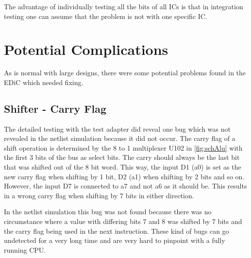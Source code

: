 The advantage of individually testing all the bits of all \glspl{IC} is that in integration testing one can assume that the problem is not with one specific \gls{IC}.
\section{Potential Complications}\label{sec:switchGlitch}
As is normal with large designs, there were some potential problems found in the \gls{EDiC} which needed fixing.
\subsection{Shifter - Carry Flag}
The detailed testing with the test adapter did reveal one bug which was not revealed in the netlist simulation because it did not occur.
The carry flag of a shift operation is determined by the 8 to 1 multiplexer U102 in \cref{fig:schAlu} with the first 3 bits of the bus as select bits.
The carry should always be the last bit that was shifted out of the 8 bit word.
This way, the input D1 (a0) is set as the new carry flag when shifting by 1 bit, D2 (a1) when shifting by 2 bits and so on.
However, the input D7 is connected to a7 and not a6 as it should be.
This results in a wrong carry flag when shifting by 7 bits in either direction.

In the netlist simulation this bug was not found because there was no circumstance where a value with differing bits 7 and 8 was shifted by 7 bits and the carry flag being used in the next instruction.
These kind of bugs can go undetected for a very long time and are very hard to pinpoint with a fully running \gls{CPU}.

